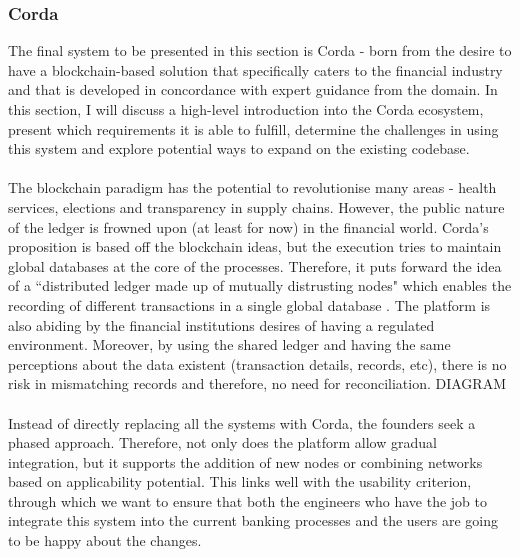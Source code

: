 \documentclass[12pt,twoside]{article}
\begin{document}
\subsubsection{Corda}
\label{sub:Corda}
The final system to be presented in this section is Corda - born from the desire to have a blockchain-based solution that specifically caters to the financial industry and that is developed in concordance with expert guidance from the domain. In this section, I will discuss a high-level introduction into the Corda ecosystem, present which requirements it is able to fulfill, determine the challenges in using this system and explore potential ways to expand on the existing codebase.
\\ \\
The blockchain paradigm has the potential to revolutionise many areas - health services, elections and transparency in supply chains. However, the public nature of the ledger is frowned upon (at least for now) in the financial world. Corda's proposition is based off the blockchain ideas, but the execution tries to maintain global databases at the core of the processes. Therefore, it puts forward the idea of a ``distributed ledger made up of mutually distrusting nodes" which enables the recording of different transactions in a single global database \cite{Corda:IP}. The platform is also abiding by the financial institutions desires of having a regulated environment. Moreover, by using the shared ledger and having the same perceptions about the data existent (transaction details, records, etc), there is no risk in mismatching records and therefore, no need for reconciliation. DIAGRAM
\\ \\
Instead of directly replacing all the systems with Corda, the founders seek a phased approach. Therefore, not only does the platform allow gradual integration, but it supports the addition of new nodes or combining networks based on applicability potential. This links well with the usability criterion, through which we want to ensure that both the engineers who have the job to integrate this system into the current banking processes and the users are going to be happy about the changes.
\\ \\
\end{document}
